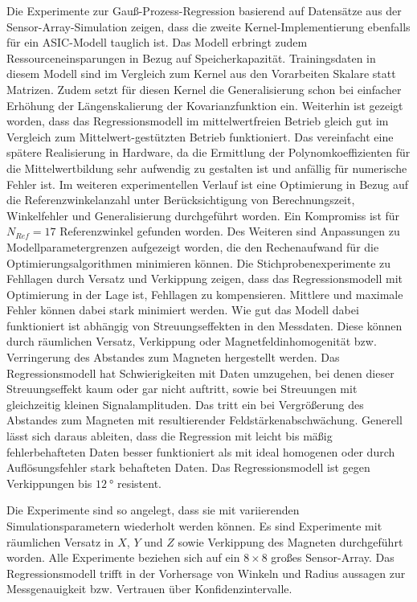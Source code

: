 \newline
Die Experimente zur Gauß-Prozess-Regression basierend auf Datensätze aus der Sensor-Array-Simulation zeigen, dass die zweite Kernel-Implementierung ebenfalls für ein ASIC-Modell tauglich ist. Das Modell erbringt zudem Ressourceneinsparungen in Bezug auf Speicherkapazität. Trainingsdaten in diesem Modell sind im Vergleich zum Kernel aus den Vorarbeiten Skalare statt Matrizen. Zudem setzt für diesen Kernel die Generalisierung schon bei einfacher Erhöhung der Längenskalierung der Kovarianzfunktion ein. Weiterhin ist gezeigt worden, dass das Regressionsmodell im mittelwertfreien Betrieb gleich gut im Vergleich zum Mittelwert-gestützten Betrieb funktioniert. Das vereinfacht eine spätere Realisierung in Hardware, da die Ermittlung der Polynomkoeffizienten für die Mittelwertbildung sehr aufwendig zu gestalten ist und anfällig für numerische Fehler ist. Im weiteren experimentellen Verlauf ist eine Optimierung in Bezug auf die Referenzwinkelanzahl unter Berücksichtigung von Berechnungszeit, Winkelfehler und Generalisierung durchgeführt worden. Ein Kompromiss ist für $N_{Ref} = 17$ Referenzwinkel gefunden worden. Des Weiteren sind Anpassungen zu Modellparametergrenzen aufgezeigt worden, die den Rechenaufwand für die Optimierungsalgorithmen minimieren können. Die Stichprobenexperimente zu Fehllagen durch Versatz und Verkippung zeigen, dass das Regressionsmodell mit Optimierung in der Lage ist, Fehllagen zu kompensieren. Mittlere und maximale Fehler können dabei stark minimiert werden. Wie gut das  Modell dabei funktioniert ist abhängig von Streuungseffekten in den Messdaten. Diese können durch räumlichen Versatz, Verkippung oder Magnetfeldinhomogenität bzw. Verringerung des Abstandes zum Magneten hergestellt werden. Das Regressionsmodell hat Schwierigkeiten mit Daten umzugehen, bei denen dieser Streuungseffekt kaum oder gar nicht auftritt, sowie bei Streuungen mit gleichzeitig kleinen Signalamplituden. Das tritt ein bei Vergrößerung des Abstandes zum Magneten mit resultierender Feldstärkenabschwächung. Generell lässt sich daraus ableiten, dass die Regression mit leicht bis mäßig fehlerbehafteten Daten besser funktioniert als mit ideal homogenen oder durch Auflösungsfehler stark behafteten Daten. Das Regressionsmodell ist gegen Verkippungen bis $\SI{12}{\degree}$ resistent.


\clearpage


Die Experimente sind so angelegt, dass sie mit variierenden Simulationsparametern wiederholt werden können. Es sind Experimente mit räumlichen Versatz in $X$, $Y$ und $Z$ sowie Verkippung des Magneten durchgeführt worden. Alle Experimente beziehen sich auf ein $8 \times 8$ großes Sensor-Array. Das Regressionsmodell trifft in der Vorhersage von Winkeln und Radius aussagen zur Messgenauigkeit bzw. Vertrauen über Konfidenzintervalle.


